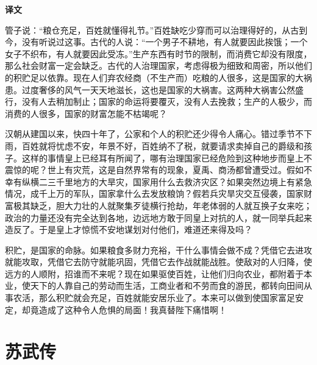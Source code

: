 \documentclass[12pt,UTF-8,openany,a4]{ctexbook}
\begin{document}
\newpage

\begin{Large}
    \noindent\textbf{译文}
\end{Large}


\vspace{1em}

\begin{large}
    \yiwen 
    管子说：“粮仓充足，百姓就懂得礼节。”百姓缺吃少穿而可以治理得好的，从古到今，没有听说过这事。古代的人说：“一个男子不耕地，有人就要因此挨饿；一个女子不织布，有人就要因此受冻。”生产东西有时节的限制，而消费它却没有限度，那么社会财富一定会缺乏。古代的人治理国家，考虑得极为细致和周密，所以他们的积贮足以依靠。现在人们弃农经商（不生产而）吃粮的人很多，这是国家的大祸患。过度奢侈的风气一天天地滋长，这也是国家的大祸害。这两种大祸害公然盛行，没有人去稍加制止；国家的命运将要覆灭，没有人去挽救；生产的人极少，而消费的人很多，国家的财富怎能不枯竭呢？
    
    汉朝从建国以来，快四十年了，公家和个人的积贮还少得令人痛心。错过季节不下雨，百姓就将忧虑不安，年景不好，百姓纳不了税，就要请求卖掉自己的爵级和孩子。这样的事情皇上已经耳有所闻了，哪有治理国家已经危险到这种地步而皇上不震惊的呢？世上有灾荒，这是自然界常有的现象，夏禹、商汤都曾遭受过。假如不幸有纵横二三千里地方的大旱灾，国家用什么去救济灾区？如果突然边境上有紧急情况，成千上万的军队，国家拿什么去发放粮饷？假若兵灾旱灾交互侵袭，国家财富极其缺乏，胆大力壮的人就聚集歹徒横行抢劫，年老体弱的人就互换子女来吃；政治的力量还没有完全达到各地，边远地方敢于同皇上对抗的人，就一同举兵起来造反了。于是皇上才惊慌不安地谋划对付他们，难道还来得及吗？
    
    积贮，是国家的命脉。如果粮食多财力充裕，干什么事情会做不成？凭借它去进攻就能攻取，凭借它去防守就能巩固，凭借它去作战就能战胜。使敌对的人归降，使远方的人顺附，招谁而不来呢？现在如果驱使百姓，让他们归向农业，都附着于本业，使天下的人靠自己的劳动而生活，工商业者和不劳而食的游民，都转向田间从事农活，那么积贮就会充足，百姓就能安居乐业了。本来可以做到使国家富足安定，却竟造成了这种令人危惧的局面！我真替陛下痛惜啊！
    
\end{large}



\chapter{苏武传}
\end{document}
